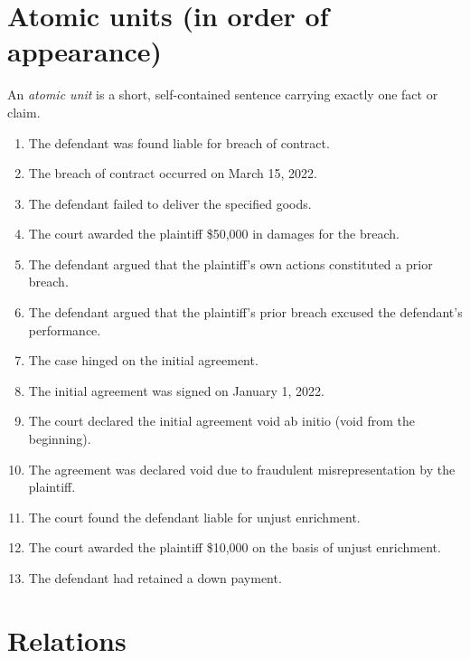 \documentclass[11pt]{article}
\begin{document}

\section{Atomic units (in order of appearance)}

An \emph{atomic unit} is a short, self-contained sentence carrying exactly one
fact or claim.

\begin{enumerate}[label=\textbf{F\arabic*.},leftmargin=*]
  \item The defendant was found liable for breach of contract.
  \item The breach of contract occurred on March 15, 2022.
  \item The defendant failed to deliver the specified goods.
  \item The court awarded the plaintiff \$50,000 in damages for the breach.
  \item The defendant argued that the plaintiff's own actions constituted a prior breach.
  \item The defendant argued that the plaintiff's prior breach excused the defendant's performance.
  \item The case hinged on the initial agreement.
  \item The initial agreement was signed on January 1, 2022.
  \item The court declared the initial agreement void ab initio (void from the beginning).
  \item The agreement was declared void due to fraudulent misrepresentation by the plaintiff.
  \item The court found the defendant liable for unjust enrichment.
  \item The court awarded the plaintiff \$10,000 on the basis of unjust enrichment.
  \item The defendant had retained a down payment.
\end{enumerate}

\section{Relations}
\end{document}

